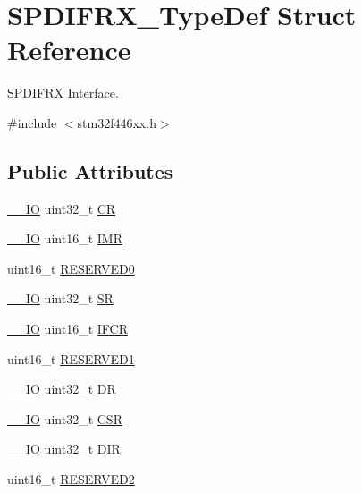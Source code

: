 \hypertarget{struct_s_p_d_i_f_r_x___type_def}{}\section{S\+P\+D\+I\+F\+R\+X\+\_\+\+Type\+Def Struct Reference}
\label{struct_s_p_d_i_f_r_x___type_def}


S\+P\+D\+I\+F\+RX Interface.  




{\ttfamily \#include $<$stm32f446xx.\+h$>$}

\subsection*{Public Attributes}
\begin{DoxyCompactItemize}
\item 
\hyperlink{core__sc300_8h_aec43007d9998a0a0e01faede4133d6be}{\+\_\+\+\_\+\+IO} uint32\+\_\+t \hyperlink{struct_s_p_d_i_f_r_x___type_def_af97c3ae3a1ced6864b75ee530d96e2d7}{CR}
\item 
\hyperlink{core__sc300_8h_aec43007d9998a0a0e01faede4133d6be}{\+\_\+\+\_\+\+IO} uint16\+\_\+t \hyperlink{struct_s_p_d_i_f_r_x___type_def_a3687732427f15d9d1aaf7b7081ec75b1}{I\+MR}
\item 
uint16\+\_\+t \hyperlink{struct_s_p_d_i_f_r_x___type_def_a8f6ab140199069c165eb87dc7a594576}{R\+E\+S\+E\+R\+V\+E\+D0}
\item 
\hyperlink{core__sc300_8h_aec43007d9998a0a0e01faede4133d6be}{\+\_\+\+\_\+\+IO} uint32\+\_\+t \hyperlink{struct_s_p_d_i_f_r_x___type_def_ad3ff338b3b53a2d26d0154b0037e2a20}{SR}
\item 
\hyperlink{core__sc300_8h_aec43007d9998a0a0e01faede4133d6be}{\+\_\+\+\_\+\+IO} uint16\+\_\+t \hyperlink{struct_s_p_d_i_f_r_x___type_def_a78e346c357c77b7fdece7c2c53471d3a}{I\+F\+CR}
\item 
uint16\+\_\+t \hyperlink{struct_s_p_d_i_f_r_x___type_def_ad75f5a8de2b69648cc353f190a4b5129}{R\+E\+S\+E\+R\+V\+E\+D1}
\item 
\hyperlink{core__sc300_8h_aec43007d9998a0a0e01faede4133d6be}{\+\_\+\+\_\+\+IO} uint32\+\_\+t \hyperlink{struct_s_p_d_i_f_r_x___type_def_aaffe413c3f6f3153b8b0b953df96e924}{DR}
\item 
\hyperlink{core__sc300_8h_aec43007d9998a0a0e01faede4133d6be}{\+\_\+\+\_\+\+IO} uint32\+\_\+t \hyperlink{struct_s_p_d_i_f_r_x___type_def_a8d811e4f5a16f36d6cb45d1369eec51b}{C\+SR}
\item 
\hyperlink{core__sc300_8h_aec43007d9998a0a0e01faede4133d6be}{\+\_\+\+\_\+\+IO} uint32\+\_\+t \hyperlink{struct_s_p_d_i_f_r_x___type_def_a76f50bd37d940fd507da3fec5326c96a}{D\+IR}
\item 
uint16\+\_\+t \hyperlink{struct_s_p_d_i_f_r_x___type_def_a3939647735a72fd528fe3e7f17ed775b}{R\+E\+S\+E\+R\+V\+E\+D2}
\end{DoxyCompactItemize}


